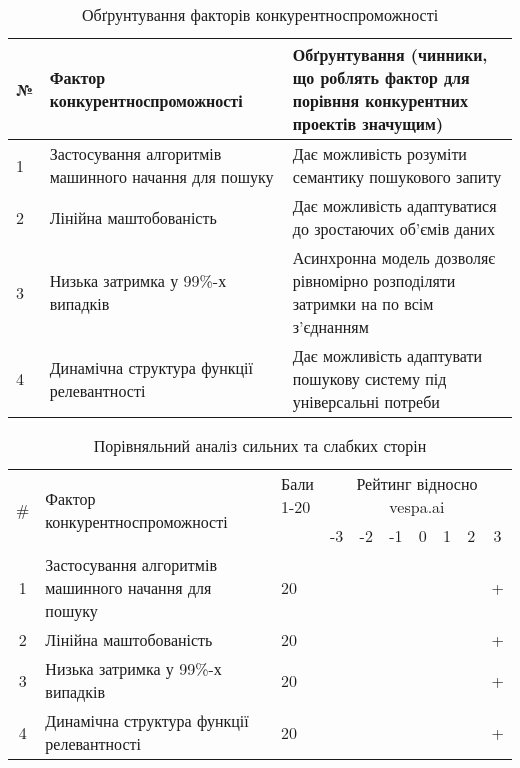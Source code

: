 \begin{table}
  \begin{tabular}
    {|l|p{7cm}|p{7cm}|} \hline
    № & Фактор конкурентноспроможності & Обґрунтування (чинники, що роблять фактор для порівння конкурентних проектів значущим) \\ \hline
    1 & Застосування алгоритмів машинного начання для пошуку & Дає можливість розуміти семантику пошукового запиту \\ \hline
    2 & Лінійна маштобованість & Дає можливість адаптуватися до зростаючих об'ємів даних \\ \hline
    3 & Низька затримка у 99\%-х випадків  & Асинхронна модель дозволяє рівномірно розподіляти затримки на по всім з'єднанням \\ \hline
    4 & Динамічна структура функції релевантності & Дає можливість адаптувати пошукову систему під універсальні потреби \\ \hline
  \end{tabular}
  \caption{Обґрунтування факторів конкурентноспроможності}
\end{table}
\begin{table}[]
  \centering
  \begin{tabular}{|c|p{8cm}|p{1cm}|c|c|c|c|c|c|c|}
    \hline
    \multirow{2}{*}{\#} & \multirow{2}{*}{Фактор конкурентноспроможності}                 & \multirowcell{2}{Бали\\ 1-20} & \multicolumn{7}{c|}{Рейтинг відносно vespa.ai} \\ \cline{4-10}

                        &                                                                 &                            &  -3 & -2  & -1  & 0 & 1 & 2 & 3 \\ \hline
    1                   & Застосування алгоритмів машинного начання для пошуку            & 20                         &     &     &     &   &   &   & + \\ \hline
    2                   & Лінійна маштобованість                                          & 20                         &     &     &     &   &   &   & + \\ \hline
    3                   & Низька затримка у 99\%-х випадків                               & 20                         &     &     &     &   &   &   & + \\ \hline
    4                   & Динамічна структура функції релевантності                       & 20                         &     &     &     &   &   &   & + \\ \hline
  \end{tabular}
  \caption{Порівняльний аналіз сильних та слабких сторін}
\end{table}

